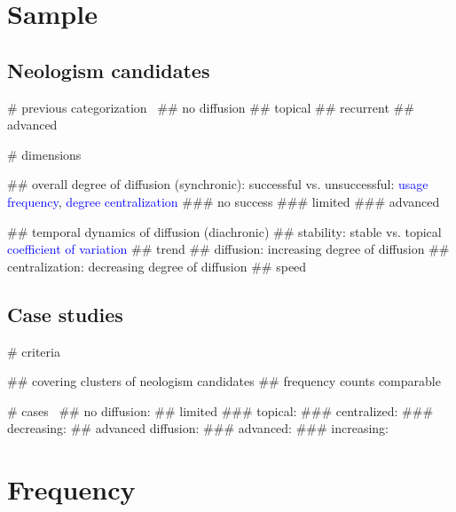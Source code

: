 \documentclass[a4paper]{scrartcl}
\newcommand{\mtrc}[1]{\textcolor{blue}{#1}}
\begin{document}
\section{Sample}

  \subsection{Neologism candidates}

    \begin{easylist}[itemize]

      # previous categorization~\parencite{Kerremans2015}
        ## no diffusion
        ## topical
        ## recurrent
        ## advanced

      # dimensions

        ## overall degree of diffusion (synchronic): successful vs. unsuccessful: \mtrc{usage frequency}, \mtrc{degree centralization}
          ### no success
          ### limited
          ### advanced

        ## temporal dynamics of diffusion (diachronic)
          ## stability: stable vs. topical \mtrc{coefficient of variation}
          ## trend
            ## diffusion: increasing degree of diffusion
            ## centralization: decreasing degree of diffusion
          ## speed

    \end{easylist}

  \subsection{Case studies}

    \begin{easylist}[itemize]

      # criteria

        ## covering clusters of neologism candidates
        ## frequency counts comparable

      # cases~\parencite{Kerremans2015}
        ## no diffusion: 
        ## limited
          ### topical: 
          ### centralized: 
          ### decreasing: 
        ## advanced diffusion:
          ### advanced: 
          ### increasing: 

    \end{easylist}

\section{Frequency}
\end{document}
